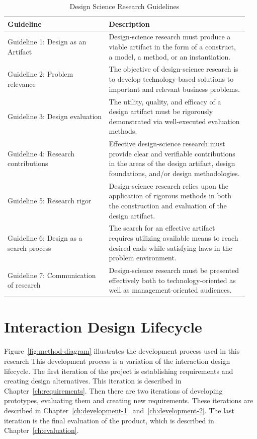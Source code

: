 \documentclass[../Main/thesis.tex]{subfiles}
\begin{document}
\begin{table}[h]
\centering
\caption[Design Science Research Guidelines]{Design Science Research Guidelines \citep[p.83]{hevner2004design}}
\begin{tabular}{|p{0.4\linewidth}|p{0.55\linewidth}|}
	\hline
	\textbf{Guideline} & \textbf{Description} \\ \hline
	Guideline 1: Design as an Artifact & Design-science research must produce a viable artifact in the form of a construct, a model, a method, or an instantiation. \\ \hline
	Guideline 2: Problem relevance & The objective of design-science research is to develop technology-based solutions to important and relevant business problems. \\ \hline
	Guideline 3: Design evaluation & The utility, quality, and efficacy of a design artifact must be rigorously demonstrated via well-executed evaluation methods. \\ \hline
	Guideline 4: Research contributions & Effective design-science research must provide clear and verifiable contributions in the areas of the design artifact, design foundations, and/or design methodologies. \\ \hline
	Guideline 5: Research rigor & Design-science research relies upon the application of rigorous methods in both the construction and evaluation of the design artifact. \\ \hline
	Guideline 6: Design as a search process & The search for an effective artifact requires utilizing available means to reach desired ends while satisfying laws in the problem environment. \\ \hline
	Guideline 7: Communication of research & Design-science research must be presented effectively both to technology-oriented as well as management-oriented audiences. \\ \hline
\end{tabular}
\label{tab:design-science-guidelines}
\end{table}

\section{Interaction Design Lifecycle}
Figure~\ref{fig:method-diagram} illustrates the development process used in this research
This development process is a variation of the interaction design lifecycle.
The first iteration of the project is establishing requirements and creating design alternatives.
This iteration is described in Chapter~\ref{ch:requirements}.
Then there are two iterations of developing prototypes, evaluating them and creating new requirements.
These iterations are described in Chapter~\ref{ch:development-1}~and~\ref{ch:development-2}.
The last iteration is the final evaluation of the product, which is described in Chapter~\ref{ch:evaluation}.
\newpage
\end{document}
